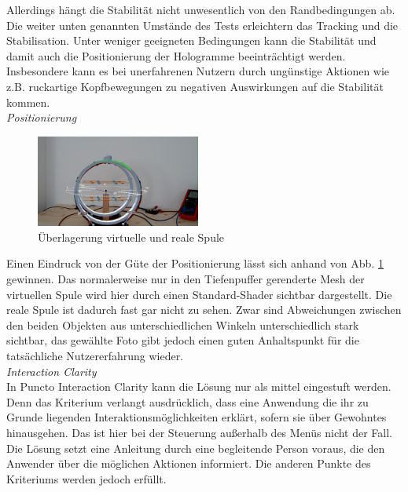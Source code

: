 Allerdings hängt die Stabilität nicht unwesentlich von den Randbedingungen ab. Die weiter unten genannten Umstände des Tests erleichtern das Tracking und die Stabilisation. Unter weniger geeigneten Bedingungen kann die Stabilität und damit auch die Positionierung der Hologramme beeinträchtigt werden. Insbesondere kann es bei unerfahrenen Nutzern durch ungünstige Aktionen wie z.B. ruckartige Kopfbewegungen zu negativen Auswirkungen auf die Stabilität kommen.\\

\textit{Positionierung}
\begin{figure}
	\centering
	\includegraphics[width=0.48\textwidth]{images/model-overlay.jpg}
	\caption{Überlagerung virtuelle und reale Spule}
	\label{img:model-overlay}
\end{figure}
Einen Eindruck von der Güte der Positionierung lässt sich anhand von Abb. \ref{img:model-overlay} gewinnen. Das normalerweise nur in den Tiefenpuffer gerenderte Mesh der virtuellen Spule wird hier durch einen Standard-Shader sichtbar dargestellt. Die reale Spule ist dadurch fast gar nicht zu sehen. Zwar sind Abweichungen zwischen den beiden Objekten aus unterschiedlichen Winkeln unterschiedlich stark sichtbar, das gewählte Foto gibt jedoch einen guten Anhaltspunkt für die tatsächliche Nutzererfahrung wieder.\\

\textit{Interaction Clarity}\\
In Puncto Interaction Clarity kann die Lösung nur als mittel eingestuft werden. Denn das Kriterium verlangt ausdrücklich, dass eine Anwendung die ihr zu Grunde liegenden Interaktionsmöglichkeiten erklärt, sofern sie über Gewohntes hinausgehen. Das ist hier bei der Steuerung außerhalb des Menüs nicht der Fall. Die Lösung setzt eine Anleitung durch eine begleitende Person voraus, die den Anwender über die möglichen Aktionen informiert. Die anderen Punkte des Kriteriums werden jedoch erfüllt.\\


